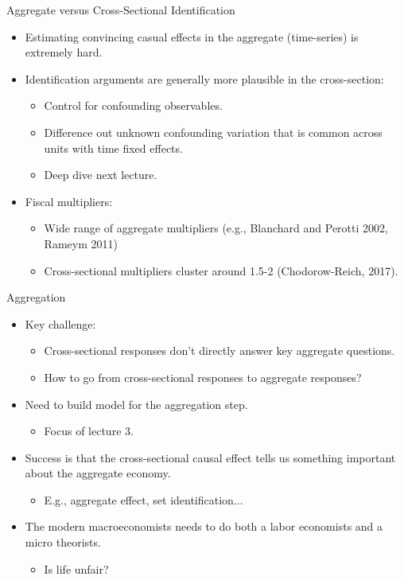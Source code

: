 \documentclass[english,xcolor=svgnames]{beamer}
\begin{document}
\begin{frame}{Aggregate versus Cross-Sectional Identification}
\begin{itemize}
\item Estimating convincing casual effects in the aggregate (time-series) is extremely hard.
\item Identification arguments are generally more plausible in the cross-section:
\begin{itemize}
	\item Control for confounding observables.
	\item Difference out unknown confounding variation that is common across units with time fixed effects.
	\item Deep dive next lecture.
\end{itemize}
\item Fiscal multipliers:
\begin{itemize}
	\item Wide range of aggregate multipliers (e.g., Blanchard and Perotti 2002, Rameym 2011) 
	\item Cross-sectional multipliers cluster around 1.5-2 (Chodorow-Reich, 2017).
\end{itemize}
\end{itemize}
\end{frame}


\begin{frame}{Aggregation}
\begin{itemize}
\item Key challenge:
\begin{itemize}
\item Cross-sectional responses don't directly answer key aggregate questions.
\item How to go from cross-sectional responses to aggregate responses?
\end{itemize}
\item Need to build model for the aggregation step.
\begin{itemize}
	\item Focus of lecture 3.
\end{itemize}
\item Success is that the cross-sectional causal effect tells us something important about the aggregate economy.
\begin{itemize}
	\item E.g., aggregate effect, set identification...
\end{itemize}
\item The modern macroeconomists needs to do both a labor economists and a micro theorists.
\begin{itemize}
	\item Is life unfair?
\end{itemize}
\end{itemize}
\end{frame}
\end{document}
